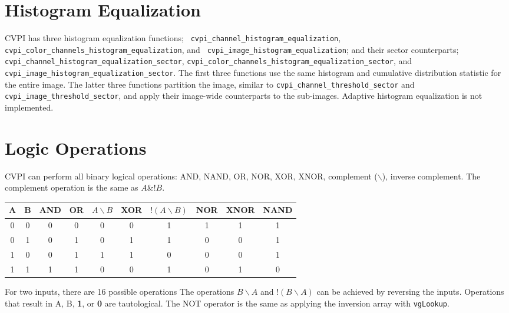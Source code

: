 \documentclass[12pt]{report}
\begin{document}
\section{Histogram Equalization}
CVPI has three histogram equalization functions; {\tt
  cvpi\_channel\_\-histogram\_equalization}, {\tt
  cvpi\_color\_\-channels\_\-histogram\_equalization}, and {\tt
  cvpi\_image\_\-histogram\_equalization}; and their sector
counterparts; {\tt cvpi\_channel\_\-histogram\_equalization\_sector},
{\tt cvpi\_color\_\-channels\_\-histogram\_equalization\_sector}, and
{\tt cvpi\_image\_\-histogram\_equalization\_sector}. The first three
functions use the same histogram and cumulative distribution statistic
for the entire image. The latter three functions partition the image,
similar to {\tt cvpi\_channel\_threshold\_sector} and {\tt
  cvpi\_image\_threshold\_sector}, and apply their image-wide
counterparts to the sub-images. Adaptive histogram equalization is
not implemented.

\section{Logic Operations}
\label{sec-3-12}
CVPI can perform all binary logical operations: AND, NAND, OR, NOR,
XOR, XNOR, complement ($\backslash$), inverse complement. The complement operation
is the same as $A\&!B$.
\begin{center}
\begin{tabular}{cccccccccc}
A & B &  AND & OR & $A\backslash B$ & XOR & $!(A\backslash B)$ & NOR & XNOR & NAND\\
\hline
0 & 0 &   0 & 0 & 0 & 0 &  1 & 1 &  1   & 1\\
0 & 1 &   0 & 1 & 0 & 1 &  1 & 0 &  0   & 1\\
1 & 0 &   0 & 1 & 1 & 1 &  0 & 0 &  0   & 1\\
1 & 1 &   1 & 1 & 0 & 0 &  1 & 0 &  1   & 0\\
\end{tabular}
\end{center}
For two inputs, there are 16 possible operations The operations
$B\backslash A$ and $!(B\backslash A)$ can be achieved by reversing
the inputs. Operations that result in A, B, {\bf 1}, or {\bf 0} are
tautological. The NOT operator is the same as applying the inversion
array with {\tt vgLookup}.
\end{document}
